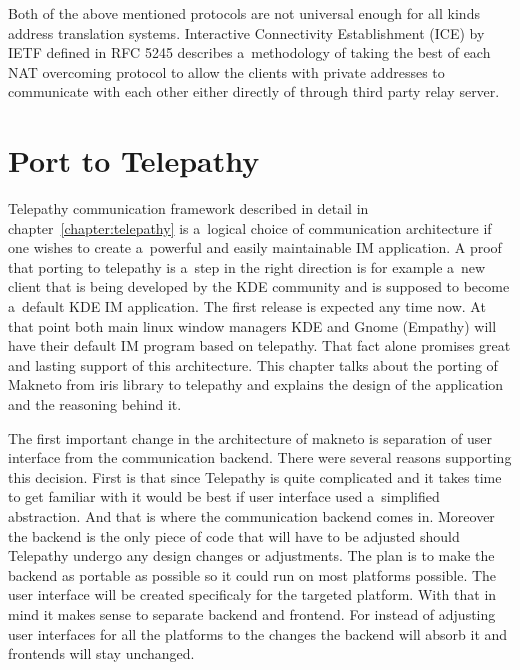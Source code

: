 Both of the above mentioned protocols are not universal enough for all kinds address translation systems. Interactive Connectivity Establishment (ICE) by IETF defined in RFC 5245 describes a~methodology of taking the best of each NAT overcoming protocol to allow the clients with private addresses to communicate with each other either directly of through third party relay server.  


\chapter{Port to Telepathy}\label{chapter:port-to-telepathy}
Telepathy communication framework described in detail in chapter~\ref{chapter:telepathy} is a~logical choice of communication architecture if one wishes to create a~powerful and easily maintainable IM application. A proof that porting to telepathy is a~step in the right direction is for example a~new client that is being developed by the KDE community and is supposed to become a~default KDE IM application. The first release is expected any time now. At that point both main linux window managers KDE and Gnome (Empathy) will have their default IM program based on telepathy. That fact alone promises great and lasting support of this architecture. This chapter talks about the porting of Makneto from iris library to telepathy and explains the design of the application and the reasoning behind it.

The first important change in the architecture of makneto is separation of user interface from the communication backend. There were several reasons supporting this decision. First is that since Telepathy is quite complicated and it takes time to get familiar with it would be best if user interface used a~simplified abstraction. And that is where the communication backend comes in. Moreover the backend is the only piece of code that will have to be adjusted should Telepathy undergo any design changes or adjustments. The plan is to make the backend as portable as possible so it could run on most platforms possible. The user interface will be created specificaly for the targeted platform. With that in mind it makes sense to separate backend and frontend. For instead of adjusting user interfaces for all the platforms to the changes the backend will absorb it and frontends will stay unchanged. 

